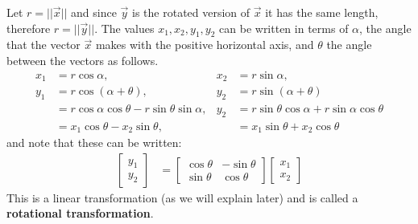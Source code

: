 \begin{example}
Let $r = ||\vec{x}||$ and since $\vec{y}$ is the rotated version of $\vec{x}$ it has the same length, therefore $r=||\vec{y}||$.  The values $x_1, x_2, y_1,y_2$ can be written in terms of $\alpha$, the angle that the vector $\vec{x}$ makes with the positive horizontal axis, and $\theta$ the angle between the vectors as follows.   
\begin{align*}
 x_1 & = r \cos \alpha, & x_2 & = r \sin \alpha, \\
 y_1 & = r \cos (\alpha+\theta), & y_2 &= r \sin (\alpha + \theta) \\
 & = r \cos \alpha \cos \theta - r \sin \theta \sin \alpha, & y_2 & = r \sin \theta \cos \alpha + r \sin \alpha \cos \theta \\
 & = x_1 \cos \theta - x_2 \sin \theta, & & = x_1 \sin \theta + x_2 \cos \theta
\end{align*}
and note that these can be written:
% 
\begin{align*}
\begin{bmatrix}
 y_1 \\ y_2 
\end{bmatrix} & =
\begin{bmatrix}
 \cos \theta & - \sin \theta \\ \sin \theta & \cos \theta 
\end{bmatrix} 
\begin{bmatrix}
 x_1 \\ x_2 
\end{bmatrix}
\end{align*}
This is a linear transformation (as we will explain later) and is called a \textbf{rotational transformation}.  
\end{example}

